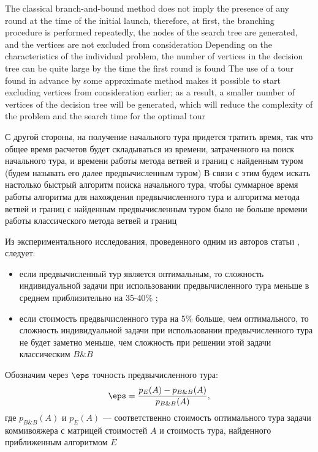 \documentclass[12pt]{article}
\begin{document}
 The classical branch-and-bound method does not imply the presence of any round at the time of the initial launch, therefore, at first, the branching procedure is performed repeatedly, the nodes of the search tree are generated, and the vertices are not excluded from consideration
Depending on the characteristics of the individual problem, the number of vertices in the decision tree can be quite large by the time the first round is found
The use of a tour found in advance by some approximate method makes it possible to start excluding vertices from consideration earlier; as a result, a smaller number of vertices of the decision tree will be generated, which will reduce the complexity of the problem and the search time for the optimal tour

  
 С другой стороны, на получение начального тура придется тратить время, так что общее время расчетов будет складываться из времени, затраченного на поиск начального тура, и времени работы метода ветвей и границ с найденным туром (будем называть его далее предвычисленным туром)
В связи с этим будем искать настолько быстрый алгоритм поиска начального тура, чтобы суммарное время работы алгоритма для нахождения предвычисленного тура и алгоритма метода ветвей и границ с найденным предвычисленным туром было не больше времени работы классического метода ветвей и границ

  
 Из экспериментального исследования, проведенного одним из авторов статьи  \cite{MF}, следует: 
 \begin{itemize} 
 \item если предвычисленный тур является оптимальным, то сложность индивидуальной задачи при  использовании предвычисленного тура меньше  в среднем приблизительно на 35-40\% ; 
 \item если стоимость  предвычисленного тура на 5\% больше, чем оптимального, то сложность индивидуальной задачи при  использовании предвычисленного тура не будет заметно меньше, чем сложность при решении этой задачи классическим $B\&B$

 \end{itemize} 
  
  
  
  
 Обозначим через $\eps$ точность предвычисленного тура: 
 \begin{align} 
 \eps=\frac{p_{E}(A)-p_{B\&B}(A)}{p_{B\&B}(A)},\label{cost_ratio} 
 \end{align}  
 где $p_{B\&B}(A)$   и $p_{E}(A)$  --- соответственно стоимость оптимального тура задачи коммивояжера с матрицей стоимостей $A$ и стоимость тура, найденного приближенным алгоритмом ${E}$
\end{document}
